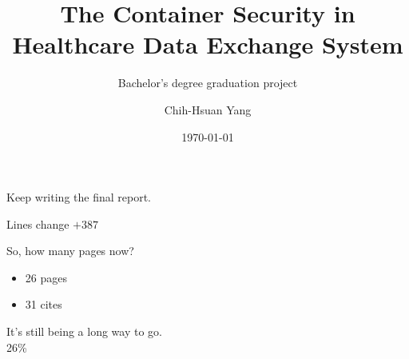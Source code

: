 \documentclass{beamer}
\title{The Container Security in Healthcare Data Exchange System}
\subtitle{Bachelor's degree graduation project}
\author{Chih-Hsuan Yang}
\institute{National Sun Yat-sen University\\
Advisor: Chun-I Fan
}
\date{\today}
\begin{document}
\begin{frame}
    \maketitle
\end{frame}

\begin{frame}{}
    \centering
    Keep writing the final report.
\end{frame}

\begin{frame}{Lines change}
    \centering
    \Huge
    {\color{secureColor} \textbf{$+387$}}
\end{frame}

\begin{frame}{So, how many pages now?}
    \begin{itemize}
        \item 26 pages
        \item 31 cites
    \end{itemize}
\end{frame}

\begin{frame}
    \centering
    It's still being a long way to go.\\
     26\%
\end{frame}
\end{document}
